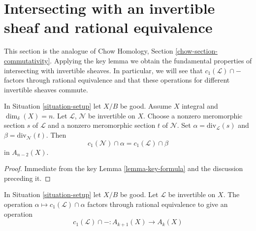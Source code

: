 \section{Intersecting with an invertible sheaf and rational equivalence}
\label{section-commutativity}

\noindent
This section is the analogue of Chow Homology, Section
\ref{chow-section-commutativity}.
Applying the key lemma we obtain the fundamental properties of intersecting
with invertible sheaves. In particular, we will see that
$c_1(\mathcal{L}) \cap -$ factors through rational equivalence and
that these operations for different invertible sheaves commute.

\begin{lemma}
\label{lemma-commutativity-on-integral}
In Situation \ref{situation-setup} let $X/B$ be good.
Assume $X$ integral and $\dim_\delta(X) = n$.
Let $\mathcal{L}$, $\mathcal{N}$ be invertible on $X$.
Choose a nonzero meromorphic section $s$ of $\mathcal{L}$
and a nonzero meromorphic section $t$ of $\mathcal{N}$.
Set $\alpha = \text{div}_\mathcal{L}(s)$ and
$\beta = \text{div}_\mathcal{N}(t)$.
Then
$$
c_1(\mathcal{N}) \cap \alpha
=
c_1(\mathcal{L}) \cap \beta
$$
in $A_{n - 2}(X)$.
\end{lemma}

\begin{proof}
Immediate from the key Lemma \ref{lemma-key-formula}
and the discussion preceding it.
\end{proof}

\begin{lemma}
\label{lemma-factors}
In Situation \ref{situation-setup} let $X/B$ be good.
Let $\mathcal{L}$ be invertible on $X$.
The operation $\alpha \mapsto c_1(\mathcal{L}) \cap \alpha$
factors through rational equivalence to give an operation
$$
c_1(\mathcal{L}) \cap - : A_{k + 1}(X) \to A_k(X)
$$
\end{lemma}

